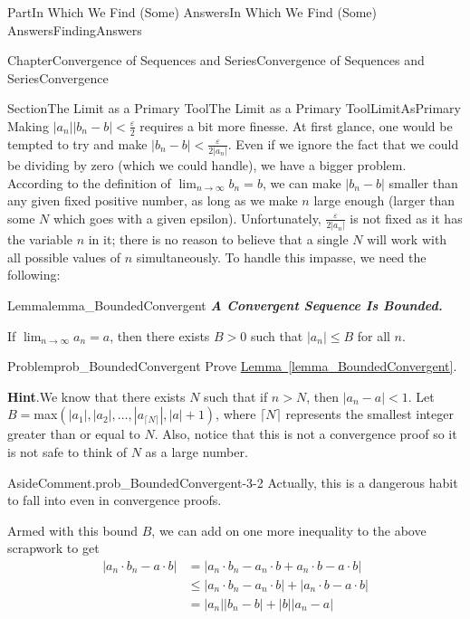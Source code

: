 \documentclass[oneside,10pt,]{book}
\newcommand{\blocktitlefont}{\relax}
\newcommand{\xreffont}{\relax}
\newcommand{\alert}[1]{\textbf{\textit{#1}}}
\numberwithin{equation}{part}
\newcommand{\abs}[1]{\left|#1\right|}
\def\limitt#1#2#3{{\displaystyle\lim_{#1\rightarrow #2}\textstyle #3}}
\newcommand{\eps}{\varepsilon}
\newcommand{\lt}{<}
\newcommand{\amp}{&}
\begin{document}
\begin{partptx}{Part}{In Which We Find (Some) Answers}{}{In Which We Find (Some) Answers}{}{}{FindingAnswers}
\begin{chapterptx}{Chapter}{Convergence of Sequences and Series}{}{Convergence of Sequences and Series}{}{}{Convergence}
\begin{sectionptx}{Section}{The Limit as a Primary Tool}{}{The Limit as a Primary Tool}{}{}{LimitAsPrimary}
Making \(\abs{a_n}\abs{b_n-b}\lt \frac{\eps}{2}\) requires a bit more finesse. At first glance, one would be tempted to try and make \(\abs{b_n-b}\lt \frac{\eps}{2|a_n|}\). Even if we ignore the fact that we could be dividing by zero (which we could handle), we have a bigger problem. According to the definition of \(\limitt{n}{\infty}{b_n}=b\), we can make \(\abs{b_n-b}\) smaller than any given fixed positive number, as long as we make \(n\) large enough (larger than some \(N\) which goes with a given epsilon). Unfortunately, \(\frac{\eps}{2|a_n|}\) is not fixed as it has the variable \(n\) in it; there is no reason to believe that a single \(N\) will work with all possible values of \(n\) simultaneously. To handle this impasse, we need the following:%
\begin{lemma}{Lemma}{}{}{lemma_BoundedConvergent}%
%
\alert{A Convergent Sequence Is Bounded.}%
\par
If \(\limitt{n}{\infty}{a_n}=a\), then there exists \(B>0\) such that \(\abs{a_n}\leq B\) for all \(n\).%
\end{lemma}
\begin{problem}{Problem}{}{prob_BoundedConvergent}%
Prove \hyperref[lemma_BoundedConvergent]{Lemma~{\xreffont\ref{lemma_BoundedConvergent}}}.%
\par\smallskip%
\noindent\textbf{\blocktitlefont Hint}.\hypertarget{prob_BoundedConvergent-3}{}\quad{}We know that there exists \(N\) such that if \(n>N\), then \(\abs{a_n-a}\lt 1\).  Let \(B=\)max\(\left(\abs{a_1},\abs{a_2},\ldots,\abs{a_{\lceil{N}\rceil}},\abs{a}+1\right)\), where \(\lceil{N}\rceil\) represents the smallest integer greater than or equal to \(N\).  Also, notice that this is not a convergence proof so it is not safe to think of \(N\) as a large number.%
\begin{aside}{Aside}{Comment.}{prob_BoundedConvergent-3-2}%
Actually, this is a dangerous habit to fall into even in convergence proofs.%
\end{aside}
\end{problem}
Armed with this bound \(B\), we can add on one more inequality to the above scrapwork to get%
\begin{align*}
\abs{a_n\cdot b_n-a\cdot b}\amp =\abs{a_n\cdot b_n-a_n\cdot b+a_n\cdot b-a\cdot b}\\
\amp \leq \abs{a_n\cdot b_n-a_n\cdot b}+ \abs{a_n\cdot b-a\cdot b}\\
\amp = \abs{a_n}\abs{b_n-b}+\abs{b}\abs{a_n-a}\\

\end{align*}
\end{sectionptx}
\end{chapterptx}
\end{partptx}
\end{document}
